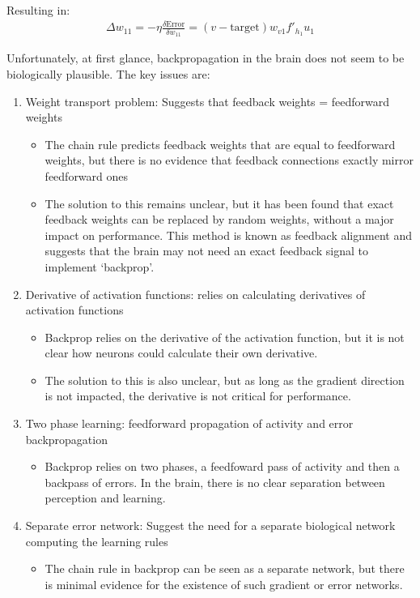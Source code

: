 \documentclass[11pt,a4paper,titlepage,dvipsnames,cmyk]{scrartcl}
\begin{document}
Resulting in:
\begin{align*}
\Delta w_{11} = -\eta \frac{\delta \text{Error}}{\delta w_{11}} = (v- \text{target}) w_{v1} f'_{h_1}u_1
\end{align*}

Unfortunately, at first glance, backpropagation in the brain does not seem to be biologically plausible. The key issues are:
\begin{enumerate}
\item Weight transport problem: Suggests that feedback weights = feedforward weights
\begin{itemize}
    \item The chain rule predicts feedback weights that are equal to feedforward weights, but there is no evidence that feedback connections exactly mirror feedforward ones
    \item The solution to this remains unclear, but it has been found that exact feedback weights can be replaced by random weights, without a major impact on performance. This method is known as feedback alignment and suggests that the brain may not need an exact feedback signal to implement `backprop'.
\end{itemize}
\item Derivative of activation functions: relies on calculating derivatives of activation functions
\begin{itemize}
    \item Backprop relies on the derivative of the activation function, but it is not clear how neurons could calculate their own derivative.
    \item The solution to this is also unclear, but as long as the gradient direction is not impacted, the derivative is not critical for performance.
\end{itemize}
\item Two phase learning: feedforward propagation of activity and error backpropagation
\begin{itemize}
    \item Backprop relies on two phases, a feedfoward pass of activity and then a backpass of errors. In the brain, there is no clear separation between perception and learning.
\end{itemize}
\item Separate error network: Suggest the need for a separate biological network computing the learning rules
\begin{itemize}
    \item The chain rule in backprop can be seen as a separate network, but there is minimal evidence for the existence of such gradient or error networks.

\end{itemize}
\end{enumerate}
\end{document}
